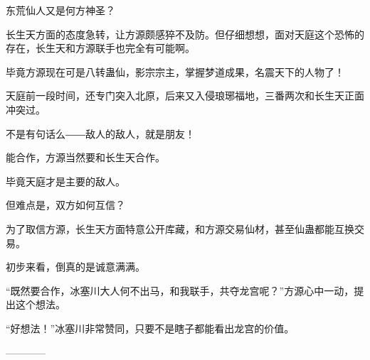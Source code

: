 \begin{this_body}
东荒仙人又是何方神圣？

长生天方面的态度急转，让方源颇感猝不及防。但仔细想想，面对天庭这个恐怖的存在，长生天和方源联手也完全有可能啊。

毕竟方源现在可是八转蛊仙，影宗宗主，掌握梦道成果，名震天下的人物了！

天庭前一段时间，还专门突入北原，后来又入侵琅琊福地，三番两次和长生天正面冲突过。

不是有句话么――敌人的敌人，就是朋友！

能合作，方源当然要和长生天合作。

毕竟天庭才是主要的敌人。

但难点是，双方如何互信？

为了取信方源，长生天方面特意公开库藏，和方源交易仙材，甚至仙蛊都能互换交易。

初步来看，倒真的是诚意满满。

“既然要合作，冰塞川大人何不出马，和我联手，共夺龙宫呢？”方源心中一动，提出这个想法。

“好想法！”冰塞川非常赞同，只要不是瞎子都能看出龙宫的价值。

------------

\end{this_body}

